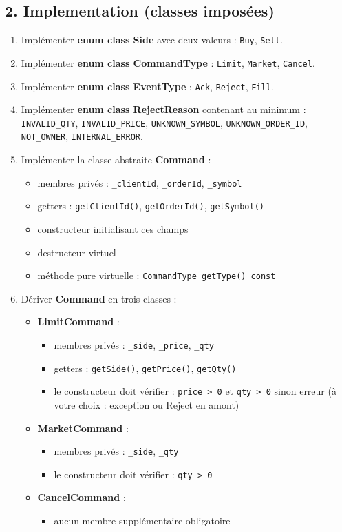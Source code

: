 \documentclass[11pt,a4paper]{article}
\begin{document}
\subsection*{2. Implementation (classes imposées)}
\begin{enumerate}
  \item Implémenter \textbf{enum class Side} avec deux valeurs : \texttt{Buy}, \texttt{Sell}.
  \item Implémenter \textbf{enum class CommandType} : \texttt{Limit}, \texttt{Market}, \texttt{Cancel}.
  \item Implémenter \textbf{enum class EventType} : \texttt{Ack}, \texttt{Reject}, \texttt{Fill}.
  \item Implémenter \textbf{enum class RejectReason} contenant au minimum :
    \texttt{INVALID\_QTY}, \texttt{INVALID\_PRICE}, \texttt{UNKNOWN\_SYMBOL}, \texttt{UNKNOWN\_ORDER\_ID},
    \texttt{NOT\_OWNER}, \texttt{INTERNAL\_ERROR}.

  \item Implémenter la classe abstraite \textbf{Command} :
  \begin{itemize}
    \item membres privés : \texttt{\_clientId}, \texttt{\_orderId}, \texttt{\_symbol}
    \item getters : \texttt{getClientId()}, \texttt{getOrderId()}, \texttt{getSymbol()}
    \item constructeur initialisant ces champs
    \item destructeur virtuel
    \item méthode pure virtuelle : \texttt{CommandType getType() const}
  \end{itemize}

  \item Dériver \textbf{Command} en trois classes :
  \begin{itemize}
    \item \textbf{LimitCommand} :
      \begin{itemize}
        \item membres privés : \texttt{\_side}, \texttt{\_price}, \texttt{\_qty}
        \item getters : \texttt{getSide()}, \texttt{getPrice()}, \texttt{getQty()}
        \item le constructeur doit vérifier : \texttt{price > 0} et \texttt{qty > 0} sinon erreur (à votre choix : exception ou Reject en amont)
      \end{itemize}
    \item \textbf{MarketCommand} :
      \begin{itemize}
        \item membres privés : \texttt{\_side}, \texttt{\_qty}
        \item le constructeur doit vérifier : \texttt{qty > 0}
      \end{itemize}
    \item \textbf{CancelCommand} :
      \begin{itemize}
        \item aucun membre supplémentaire obligatoire
      \end{itemize}
  \end{itemize}


\end{enumerate}
\end{document}
